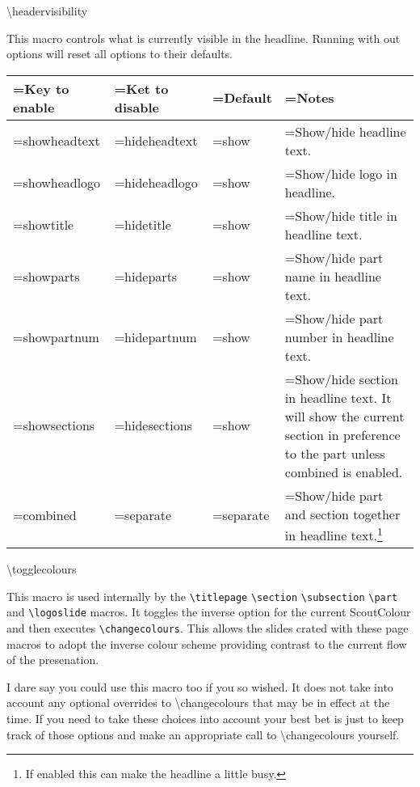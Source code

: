 \begin{frame}{\textbackslash{}headervisibility}
\tiny
\parbox{\textwidth}{\scriptsize This macro controls what is currently visible in the headline. Running with out options will reset all options to their defaults.}

\begin{tabularx}{\textwidth}{>{\hsize=0.8\hsize\linewidth=\hsize}X
                                >{\hsize=0.8\hsize\linewidth=\hsize}X
                                >{\hsize=0.4\hsize\linewidth=\hsize}X
                                >{\hsize=2.0\hsize\linewidth=\hsize}X}
\toprule
\textbf{Key to enable}&\textbf{Ket to disable}&\textbf{Default}&\textbf{Notes}\\
\midrule
showheadtext&hideheadtext&show&Show/hide headline text.\\
showheadlogo&hideheadlogo&show&Show/hide logo in headline.\\
showtitle&hidetitle&show&Show/hide title in headline text.\\
showparts&hideparts&show&Show/hide part name in headline text.\\
showpartnum&hidepartnum&show&Show/hide part number in headline text.\\
showsections&hidesections&show&Show/hide section in headline text. It will show the current section in preference to the part unless combined is enabled.\\
combined&separate&separate&Show/hide part and section together in headline text.\footnote{If enabled this can make the headline a little busy.}\\
\bottomrule
\end{tabularx}
\end{frame}

\begin{frame}{\textbackslash{}togglecolours}
\small
\parbox{\textwidth}{This macro is used internally by the
{\tt \textbackslash{}titlepage}
{\tt \textbackslash{}section}
{\tt \textbackslash{}subsection}
{\tt \textbackslash{}part} and 
{\tt \textbackslash{}logoslide} macros.
It toggles the inverse option for the current ScoutColour and then executes {\tt \textbackslash{}changecolours}. This allows the slides crated with these page macros to adopt the inverse colour scheme providing contrast to the current flow of the presenation.}

\parbox{\textwidth}{I dare say you could use this macro too if you so wished. It does \alert{not} take into account any optional overrides to \textbackslash{}changecolours that
may be in effect at the time. If you need to take these choices into account your best bet is just to keep track of those options and make an
appropriate call to \textbackslash{}changecolours yourself.}
\end{frame}

